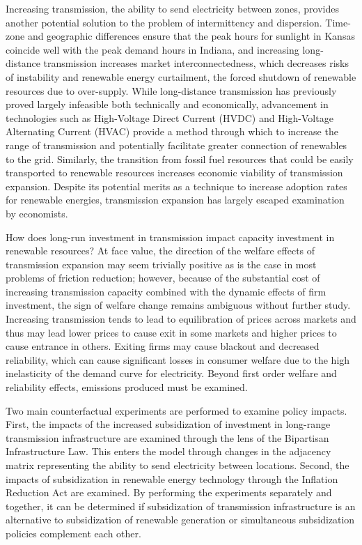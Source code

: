 \documentclass[12pt]{article}
\begin{document}
Increasing transmission, the ability to send electricity between zones, provides another potential solution to the problem of intermittency and dispersion. Time-zone and geographic differences ensure that the peak hours for sunlight in Kansas coincide well with the peak demand hours in Indiana, and increasing long-distance transmission increases market interconnectedness, which decreases risks of instability and renewable energy curtailment, the forced shutdown of renewable resources due to over-supply. While long-distance transmission has previously proved largely infeasible both technically and economically, advancement in technologies such as High-Voltage Direct Current (HVDC) and High-Voltage Alternating Current (HVAC) provide a method through which to increase the range of transmission and potentially facilitate greater connection of renewables to the grid. Similarly, the transition from fossil fuel resources that could be easily transported to renewable resources increases economic viability of transmission expansion. Despite its potential merits as a technique to increase adoption rates for renewable energies, transmission expansion has largely escaped examination by economists.

How does long-run investment in transmission impact capacity investment in renewable resources? At face value, the direction of the welfare effects of transmission expansion may seem trivially positive as is the case in most problems of friction reduction; however, because of the substantial cost of increasing transmission capacity combined with the dynamic effects of firm investment, the sign of welfare change remains ambiguous without further study. Increasing transmission tends to lead to equilibration of prices across markets and thus may lead lower prices to cause exit in some markets and higher prices to cause entrance in others. Exiting firms may cause blackout and decreased reliability, which can cause significant losses in consumer welfare due to the high inelasticity of the demand curve for electricity. Beyond first order welfare and reliability effects, emissions produced must be examined. 

Two main counterfactual experiments are performed to examine policy impacts. First, the impacts of the increased subsidization of investment in long-range transmission infrastructure are examined through the lens of the Bipartisan Infrastructure Law. This enters the model through changes in the adjacency matrix representing the ability to send electricity between locations. Second, the impacts of subsidization in renewable energy technology through the Inflation Reduction Act are examined. By performing the experiments separately and together, it can be determined if subsidization of transmission infrastructure is an alternative to subsidization of renewable generation or simultaneous subsidization policies complement each other.
\end{document}
